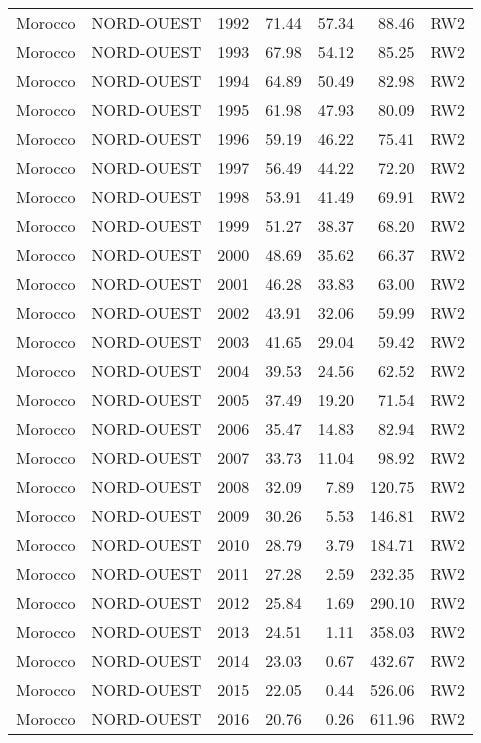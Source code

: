 \begin{longtable}{lllrrrl}
  Morocco & NORD-OUEST & 1992 & 71.44 & 57.34 & 88.46 & RW2 \\ 
  Morocco & NORD-OUEST & 1993 & 67.98 & 54.12 & 85.25 & RW2 \\ 
  Morocco & NORD-OUEST & 1994 & 64.89 & 50.49 & 82.98 & RW2 \\ 
  Morocco & NORD-OUEST & 1995 & 61.98 & 47.93 & 80.09 & RW2 \\ 
  Morocco & NORD-OUEST & 1996 & 59.19 & 46.22 & 75.41 & RW2 \\ 
  Morocco & NORD-OUEST & 1997 & 56.49 & 44.22 & 72.20 & RW2 \\ 
  Morocco & NORD-OUEST & 1998 & 53.91 & 41.49 & 69.91 & RW2 \\ 
  Morocco & NORD-OUEST & 1999 & 51.27 & 38.37 & 68.20 & RW2 \\ 
  Morocco & NORD-OUEST & 2000 & 48.69 & 35.62 & 66.37 & RW2 \\ 
  Morocco & NORD-OUEST & 2001 & 46.28 & 33.83 & 63.00 & RW2 \\ 
  Morocco & NORD-OUEST & 2002 & 43.91 & 32.06 & 59.99 & RW2 \\ 
  Morocco & NORD-OUEST & 2003 & 41.65 & 29.04 & 59.42 & RW2 \\ 
  Morocco & NORD-OUEST & 2004 & 39.53 & 24.56 & 62.52 & RW2 \\ 
  Morocco & NORD-OUEST & 2005 & 37.49 & 19.20 & 71.54 & RW2 \\ 
  Morocco & NORD-OUEST & 2006 & 35.47 & 14.83 & 82.94 & RW2 \\ 
  Morocco & NORD-OUEST & 2007 & 33.73 & 11.04 & 98.92 & RW2 \\ 
  Morocco & NORD-OUEST & 2008 & 32.09 & 7.89 & 120.75 & RW2 \\ 
  Morocco & NORD-OUEST & 2009 & 30.26 & 5.53 & 146.81 & RW2 \\ 
  Morocco & NORD-OUEST & 2010 & 28.79 & 3.79 & 184.71 & RW2 \\ 
  Morocco & NORD-OUEST & 2011 & 27.28 & 2.59 & 232.35 & RW2 \\ 
  Morocco & NORD-OUEST & 2012 & 25.84 & 1.69 & 290.10 & RW2 \\ 
  Morocco & NORD-OUEST & 2013 & 24.51 & 1.11 & 358.03 & RW2 \\ 
  Morocco & NORD-OUEST & 2014 & 23.03 & 0.67 & 432.67 & RW2 \\ 
  Morocco & NORD-OUEST & 2015 & 22.05 & 0.44 & 526.06 & RW2 \\ 
  Morocco & NORD-OUEST & 2016 & 20.76 & 0.26 & 611.96 & RW2 \\ 

\end{longtable}
